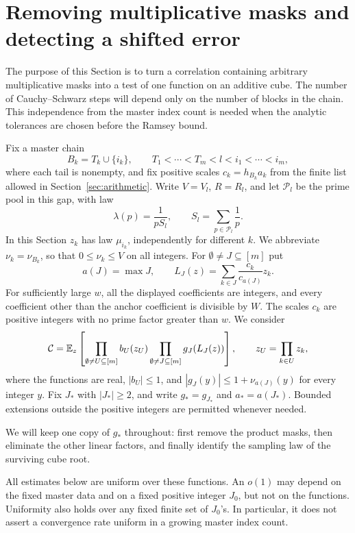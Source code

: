 \section{Removing multiplicative masks and detecting a shifted error}
\label{sec:correlation}

The purpose of this Section is to turn a correlation containing arbitrary
multiplicative masks into a test of one function on an additive cube.
The number of Cauchy--Schwarz steps will depend only on the number of
blocks in the chain.  This independence from the master index count is
needed when the analytic tolerances are chosen before the Ramsey bound.

Fix a master chain
\[
 B_k=T_k\cup\{i_k\},\qquad
 T_1<\cdots<T_m<l<i_1<\cdots<i_m,
\]
where each tail is nonempty, and fix positive scales
$c_k=h_{B_k}a_k$ from the finite list allowed in
Section~\ref{sec:arithmetic}.  Write $V=V_l$, $R=R_l$, and let
$\mathcal P_l$ be the prime pool in this gap, with law
\[
 \lambda(p)=\frac{1}{pS_l},\qquad
 S_l=\sum_{p\in\mathcal P_l}\frac1p.
\]
In this Section $z_k$ has law $\mu_{i_k}$, independently for different
$k$.  We abbreviate $\nu_k=\nu_{B_k}$, so that $0\le\nu_k\le V$ on
all integers.  For $\emptyset\ne J\subseteq[m]$ put
\[
 a(J)=\max J,\qquad
 L_J(z)=\sum_{k\in J}\frac{c_k}{c_{a(J)}}z_k.
\]
For sufficiently large $w$, all the displayed coefficients are integers,
and every coefficient other than the anchor coefficient is divisible by
$W$.  The scales $c_k$ are positive integers with no prime factor greater
than $w$.  We consider
\begin{equation}
 \mathcal C=
 \mathbb E_z\left[
   \prod_{\emptyset\ne U\subseteq[m]}b_U(z_U)
   \prod_{\emptyset\ne J\subseteq[m]}g_J(L_J(z))
 \right],
 \qquad z_U=\prod_{k\in U}z_k,
 \label{eq:correlation-initial}
\end{equation}
where the functions are real, $|b_U|\le1$, and
$|g_J(y)|\le1+\nu_{a(J)}(y)$ for every integer $y$.
Fix $J_*$ with $|J_*|\ge2$, and write $g_*=g_{J_*}$ and
$a_* = a(J_*)$.  Bounded extensions outside the positive integers are
permitted whenever needed.

We will keep one copy of $g_*$ throughout: first remove the product
masks, then eliminate the other linear factors, and finally identify
the sampling law of the surviving cube root.

All estimates below are uniform over these functions.  An $o(1)$ may
depend on the fixed master data and on a fixed positive integer $J_0$,
but not on the functions.  Uniformity also holds over any fixed finite
set of $J_0$'s.  In particular, it does not assert a convergence rate
uniform in a growing master index count.

